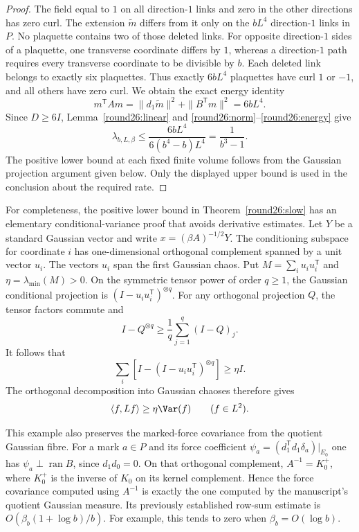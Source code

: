 \begin{proof}
The field equal to $1$ on all direction-$1$ links and zero in the other
directions has zero curl. The extension $\widetilde m$ differs from it
only on the $bL^4$ direction-$1$ links in $P$. No plaquette contains two
of those deleted links. For opposite direction-$1$ sides of a plaquette,
one transverse coordinate differs by $1$, whereas a direction-$1$ path
requires every transverse coordinate to be divisible by $b$. Each deleted
link belongs to exactly six plaquettes. Thus exactly $6bL^4$ plaquettes
have curl $1$ or $-1$, and all others have zero curl. We obtain the exact
energy identity
\begin{equation}\label{round26:energy}
 m^{\mathsf T}Am=\|d_1\widetilde m\|^2+
                 \|B^{\mathsf T}m\|^2=6bL^4.
\end{equation}
Since $D\ge6I$, Lemma~\ref{round26:linear} and \eqref{round26:norm}--\eqref{round26:energy} give
\[
 \lambda_{b,L,\beta}\le\frac{6bL^4}{6(b^4-b)L^4}
       =\frac1{b^3-1}.
\]
The positive lower bound at each fixed finite volume follows from the
Gaussian projection argument given below. Only the displayed upper bound
is used in the conclusion about the required rate.
\end{proof}

For completeness, the positive lower bound in Theorem~\ref{round26:slow} has an
elementary conditional-variance proof that avoids derivative estimates.
Let $Y$ be a standard Gaussian vector and write $x=(\beta A)^{-1/2}Y$.
The conditioning subspace for coordinate $i$ has one-dimensional
orthogonal complement spanned by a unit vector $u_i$. The vectors $u_i$
span the first Gaussian chaos. Put $M=\sum_i u_i u_i^{\mathsf T}$ and
$\eta=\lambda_{\min}(M)>0$. On the symmetric tensor power of order $q\ge1$,
the Gaussian conditional projection is $(I-u_i u_i^{\mathsf T})^{\otimes q}$.
For any orthogonal projection $Q$, the tensor factors commute and
\[
 I-Q^{\otimes q}\ge\frac1q\sum_{j=1}^q (I-Q)_j.
\]
It follows that
\[
 \sum_i\left[I-(I-u_i u_i^{\mathsf T})^{\otimes q}\right]\ge\eta I.
\]
The orthogonal decomposition into Gaussian chaoses therefore gives
\[
 \langle f,Lf\rangle\ge\eta\Var(f)\qquad(f\in L^2).
\]

This example also preserves the marked-force covariance from the quotient
Gaussian fibre. For a mark $a\in P$ and its force coefficient
$\psi_a=(d_1^{\mathsf T}d_1\delta_a)|_{E_0}$ one has
$\psi_a\perp\operatorname{ran}B$, since $d_1d_0=0$. On that orthogonal
complement, $A^{-1}=K_0^+$, where $K_0^+$ is the inverse of $K_0$ on its
kernel complement. Hence the force covariance computed using $A^{-1}$ is
exactly the one computed by the manuscript's quotient Gaussian measure.
Its previously established row-sum estimate is $O(\beta_b(1+\log b)/b)$.
For example, this tends to zero when $\beta_b=O(\log b)$.

